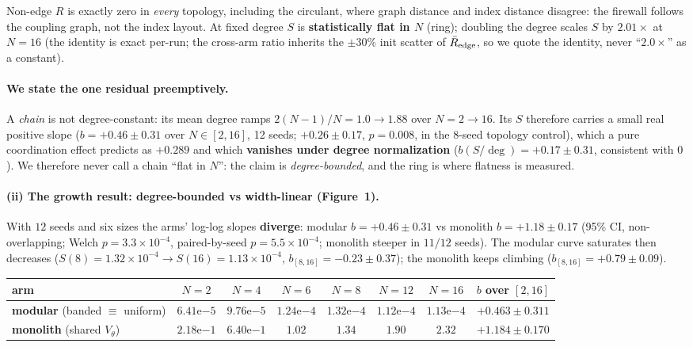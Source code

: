 \documentclass[11pt]{article}
\begin{document}
Non-edge $R$ is exactly zero in \emph{every} topology, including the circulant, where graph distance and index distance disagree: the firewall follows the coupling graph, not the index layout. At fixed degree $S$ is \textbf{statistically flat in $N$} (ring); doubling the degree scales $S$ by $2.01\times$ at $N=16$ (the identity is exact per-run; the cross-arm ratio inherits the $\pm30\%$ init scatter of $\bar R_{\rm edge}$, so we quote the identity, never ``$2.0\times$'' as a constant).

\paragraph{We state the one residual preemptively.} A \emph{chain} is not degree-constant: its mean degree ramps $2(N{-}1)/N=1.0\to1.88$ over $N=2\to16$. Its $S$ therefore carries a small real positive slope ($b=+0.46\pm0.31$ over $N\in[2,16]$, 12 seeds; $+0.26\pm0.17$, $p=0.008$, in the 8-seed topology control), which a pure coordination effect predicts as $+0.289$ and which \textbf{vanishes under degree normalization} ($b(S/\deg)=+0.17\pm0.31$, consistent with $0$). We therefore never call a chain ``flat in $N$'': the claim is \emph{degree-bounded}, and the ring is where flatness is measured.

\paragraph{(ii) The growth result: degree-bounded vs width-linear (Figure~1).} With $12$ seeds and six sizes the arms' log-log slopes \textbf{diverge}: modular $b=+0.46\pm0.31$ vs monolith $b=+1.18\pm0.17$ (95\% CI, non-overlapping; Welch $p=3.3\times10^{-4}$, paired-by-seed $p=5.5\times10^{-4}$; monolith steeper in $11/12$ seeds). The modular curve saturates then decreases ($S(8)=1.32\times10^{-4}\to S(16)=1.13\times10^{-4}$, $b_{[8,16]}=-0.23\pm0.37$); the monolith keeps climbing ($b_{[8,16]}=+0.79\pm0.09$).

\begin{center}\footnotesize\setlength{\tabcolsep}{4pt}
\begin{tabular}{lcccccc c}
\toprule
arm & $N{=}2$ & $N{=}4$ & $N{=}6$ & $N{=}8$ & $N{=}12$ & $N{=}16$ & $b$ over $[2,16]$ \\
\midrule
\textbf{modular} (banded $\equiv$ uniform) & $6.41\mathrm{e}{-5}$ & $9.76\mathrm{e}{-5}$ & $1.24\mathrm{e}{-4}$ & $1.32\mathrm{e}{-4}$ & $1.12\mathrm{e}{-4}$ & $1.13\mathrm{e}{-4}$ & $+0.463\pm0.311$ \\
\textbf{monolith} (shared $V_\theta$) & $2.18\mathrm{e}{-1}$ & $6.40\mathrm{e}{-1}$ & $1.02$ & $1.34$ & $1.90$ & $2.32$ & $+1.184\pm0.170$ \\
\bottomrule
\end{tabular}
\end{center}
\end{document}
